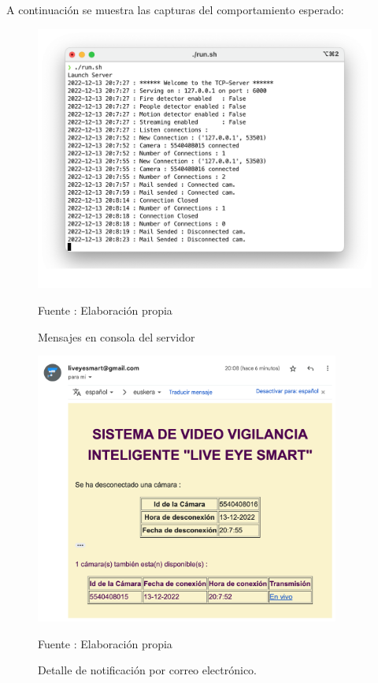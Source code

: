 A continuación se muestra las capturas del comportamiento esperado:

\begin{figure}[H]
    \begin{center}
        \includegraphics[width=13cm]{img/capitulo_6/cam_disconnected_n_cams.png}
        \caption{Mensajes en consola del servidor}
        Fuente : Elaboración propia
    \end{center}
\end{figure}

\begin{figure}[H]
    \begin{center}
        \includegraphics[width=10cm]{img/capitulo_6/mail3.png}
    \end{center}
    \begin{center}
        \caption{Detalle de notificación por correo electrónico.}
        Fuente : Elaboración propia
    \end{center}
\end{figure}

